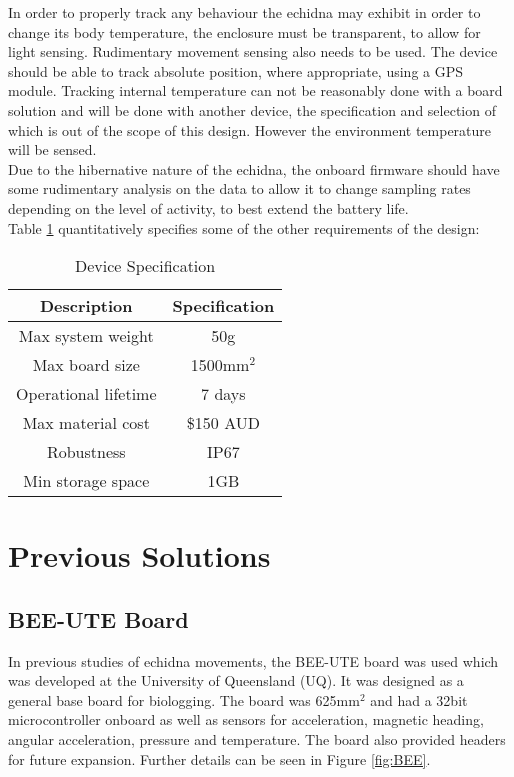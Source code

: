 \documentclass[12pt,openany,a4paper]{book}
\begin{document}
	In order to properly track any behaviour the echidna may exhibit in order to change its body temperature, the enclosure must be transparent, to allow for light sensing. Rudimentary movement sensing also needs to be used. The device should be able to track absolute position, where appropriate, using a GPS module. Tracking internal temperature can not be reasonably done with a board solution and will be done with another device, the specification and selection of which is out of the scope of this design. However the environment temperature will be sensed. \\
	
	Due to the hibernative nature of the echidna, the onboard firmware should have some rudimentary analysis on the data to allow it to change sampling rates depending on the level of activity, to best extend the battery life. \\
	
	Table \ref{tab:SPEC} quantitatively specifies some of the  other requirements of the design: \\
	\begin{table}[H]
		\centering
		\begin{adjustbox}{max width=\textwidth}
			\begin{tabular}{c | c }
				Description & Specification\\
				\hline
				Max system weight & 50g \\
				Max board size & 1500mm$^{2}$  \\
				Operational lifetime & 7 days \\
				Max material cost & \$150 AUD \\
				Robustness & IP67 \\
				Min storage space & 1GB
			\end{tabular}
		\end{adjustbox}
		\caption{Device Specification}
		\label{tab:SPEC}
	\end{table}
	
	\section{Previous Solutions}
		\subsection{BEE-UTE Board}
			In previous studies of echidna movements, the BEE-UTE board was used \cite{Freakley13} which was developed at the University of Queensland (UQ). It was designed as a general base board for biologging. The board was 625mm$^{2}$ and had a 32bit microcontroller onboard as well as sensors for acceleration, magnetic heading, angular acceleration, pressure and temperature. The board also provided headers for future expansion. Further details can be seen in Figure \ref{fig:BEE}. \\
			
\end{document}
